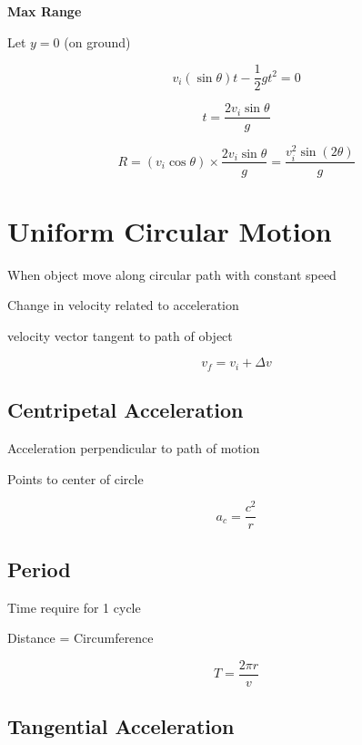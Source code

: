 \documentclass[12pt]{article}
\begin{document}
\begin{spacing}{1.5}
\textbf{Max Range}

Let $y = 0$ (on ground)

$$v_i (\sin{\theta} )t - \frac{1}{2} gt^2 = 0$$

$$t = \frac{2 v_i \sin{\theta}}{g}$$

$$R = (v_i \cos{\theta}) \times \frac{2 v_i \sin{\theta}}{g} = \frac{v_i^2 \sin{(2\theta)}}{g}$$

\section{Uniform Circular Motion}

\begin{itemize*}
	\item When object move along circular path with constant speed
	\item Change in velocity related to acceleration
	\item velocity vector tangent to path of object
\end{itemize*}

$$v_f = v_i + \Delta v$$

\subsection{Centripetal Acceleration}

\begin{itemize*}
	\item Acceleration perpendicular to path of motion
	\item Points to center of circle
\end{itemize*}

$$a_c = \frac{c^2}{r}$$

\subsection{Period}

\begin{itemize*}
	\item Time require for 1 cycle
	\item Distance = Circumference
\end{itemize*}

$$T = \frac{2 \pi r}{v}$$

\subsection{Tangential Acceleration}


\end{spacing}
\end{document}
